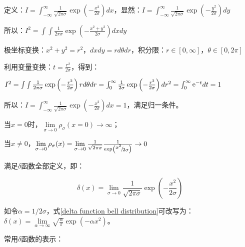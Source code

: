 定义：$I = \int_{ - \infty }^\infty  {\frac{1}{{\sqrt {2\pi \sigma } }}} \exp \left( { - \frac{{x^2 }}{{2\sigma }}} \right)dx$，显然：$I = \int_{ - \infty }^\infty  {\frac{1}{{\sqrt {2\pi \sigma } }}} \exp \left( { - \frac{{y^2 }}{{2\sigma }}} \right)dy$

所以：$I^2  = \int {\int {\frac{1}{{2\pi \sigma }}\exp \left( { - \frac{{x^2  + y^2 }}{{2\sigma }}} \right)dxdy} } $

极坐标变换：$x^2  + y^2  = r^2 $，$dxdy = rd\theta dr$，积分限：$r \in \left[ {0,\infty } \right]$，$\theta  \in \left[ {0,2\pi } \right]$

利用变量变换：$t = \frac{{r^2 }}{{2\sigma }}$，得到：

$I^2  = \int {\int {\frac{1}{{2\pi \sigma }}\exp \left( { - \frac{{r^2 }}{{2\sigma }}} \right)rd\theta dr} }  = \int_0^\infty  {\frac{1}{{2\sigma }}} \exp \left( { - \frac{{r^2 }}{{2\sigma }}} \right)dr^2  = \int_0^\infty  {{\mathop{\rm e}\nolimits} ^{ - t} dt}  = 1$

所以：$I = \int_{ - \infty }^\infty  {\frac{1}{{\sqrt {2\pi \sigma } }}} \exp \left( { - \frac{{x^2 }}{{2\sigma }}} \right)dx = 1$，满足归一条件。

当$x=0$时，$\mathop {\lim }\limits_{\sigma  \to 0} \rho _\sigma  (x
= 0) \to \infty $；

当$x \ne 0$，$\mathop {\lim }\limits_{\sigma  \to 0} \rho _\sigma  (x) = \mathop {\lim }\limits_{\sigma  \to 0} \frac{1}{{\sqrt {2\pi \sigma } }}\frac{1}{{\exp \left( {{\raise0.5ex\hbox{$\scriptstyle {x^2 }$}
\kern-0.1em/\kern-0.15em
\lower0.25ex\hbox{$\scriptstyle {2\sigma }$}}} \right)}} \to 0$


满足$\delta$函数全部定义，即：

\begin{center}
\begin{equation}\label{delta function bell distribution}
    \delta (x) = \mathop {\lim }\limits_{\sigma  \to 0} \frac{1}{{\sqrt {2\pi \sigma } }}\exp \left( { - \frac{{x^2 }}{{2\sigma }}} \right)
\end{equation}
\end{center}

如令$\alpha  = 1/2\sigma $，式\ref{delta function bell distribution}可改写为：$\delta (x) = \mathop {\lim }\limits_{\alpha  \to \infty } \sqrt {\frac{\alpha }{\pi }} \exp \left( { - \alpha x^2 } \right)$。


常用$\delta$函数的表示：

